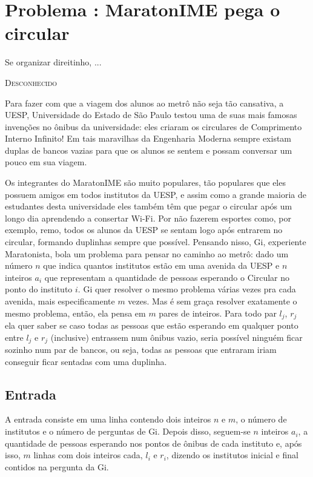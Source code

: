 \section*{Problema \proxLetra: MaratonIME pega o circular}

\epigraph{Se organizar direitinho, ...}{\textsc{Desconhecido}}

Para fazer com que a viagem dos alunos ao metrô não seja tão cansativa, a UESP, Universidade do Estado de São Paulo testou uma de suas mais famosas invenções no ônibus da universidade: eles criaram os circulares de Comprimento Interno Infinito! Em tais maravilhas da Engenharia Moderna sempre existam duplas de bancos vazias para que os alunos se sentem e possam conversar um pouco em sua viagem.
 
Os integrantes do MaratonIME são muito populares, tão populares que eles possuem amigos em todos institutos da UESP, e assim como a grande maioria de estudantes desta universidade eles também têm que pegar o circular após um longo dia aprendendo a consertar Wi-Fi. Por não fazerem esportes como, por exemplo, remo, todos os alunos da UESP se sentam logo após entrarem no circular, formando duplinhas sempre que possível. Pensando nisso, Gi, experiente Maratonista, bola um problema para pensar no caminho ao metrô: dado um número $n$ que indica quantos institutos estão em uma avenida da UESP e $n$ inteiros $a_i$ que representam a quantidade de pessoas esperando o Circular no ponto do instituto $i$. Gi quer resolver o mesmo problema várias vezes pra cada avenida, mais especificamente $m$ vezes. Mas é sem graça resolver exatamente o mesmo problema, então, ela pensa em $m$ pares de inteiros. Para todo par $l_j$, $r_j$ ela quer saber se caso todas as pessoas que estão esperando em qualquer ponto entre $l_j$ e $r_j$ (inclusive) entrassem num ônibus vazio, seria possível ninguém ficar sozinho num par de bancos, ou seja, todas as pessoas que entraram iriam conseguir ficar sentadas com uma duplinha.

\subsection*{Entrada}

A entrada consiste em uma linha contendo dois inteiros $n$ e $m$, o número de institutos e o número de perguntas de Gi. Depois disso, seguem-se $n$ inteiros $a_i$, a quantidade de pessoas esperando nos pontos de ônibus de cada instituto e, após isso, $m$ linhas com dois inteiros cada, $l_i$ e $r_i$, dizendo os institutos inicial e final contidos na pergunta da Gi.


